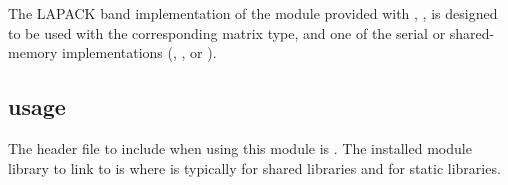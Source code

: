 
The LAPACK band implementation of the {\sunlinsol} module provided
with {\sundials}, {\sunlinsollapband}, is designed to be used with the
corresponding {\sunmatband} matrix type, and one of the serial or
shared-memory {\nvector} implementations ({\nvecs}, {\nvecopenmp}, or
{\nvecpthreads}).

\subsection{{\sunlinsollapband} usage}\label{ss:sunlinsol_lapband_usage}

The header file to include when using this module 
is . The installed module
library to link to is
where  is typically  for shared libraries and
 for static libraries.

